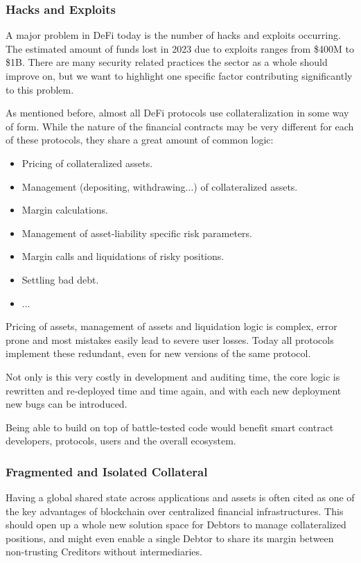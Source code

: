 \documentclass[sigconf,nonacm]{acmart}
\begin{document}
\subsubsection{Hacks and Exploits}
\label{subsubsec:hacks-and-exploits}

A major problem in DeFi today is the number of hacks and exploits occurring.
The estimated amount of funds lost in 2023 due to exploits ranges from \$400M to \$1B.
There are many security related practices the sector as a whole should improve on,
but we want to highlight one specific factor contributing significantly to this problem.

As mentioned before, almost all DeFi protocols use collateralization in some way of form.
While the nature of the financial contracts may be very different for each of these protocols, they share a great amount of common logic:
\begin{itemize}
    \item Pricing of collateralized assets.
    \item Management (depositing, withdrawing...) of collateralized assets.
    \item Margin calculations.
    \item Management of asset-liability specific risk parameters.
    \item Margin calls and liquidations of risky positions.
    \item Settling bad debt.
    \item ...
\end{itemize}

Pricing of assets, management of assets and liquidation logic is complex, error prone and most mistakes easily lead to severe user losses.
Today all protocols implement these redundant, even for new versions of the same protocol.

Not only is this very costly in development and auditing time, the core logic is rewritten and re-deployed time and time again,
and with each new deployment new bugs can be introduced.

Being able to build on top of battle-tested code would benefit smart contract developers, protocols, users and the overall ecosystem.

\subsubsection{Fragmented and Isolated Collateral}
\label{subsubsec:fragmented-collateral}

Having a global shared state across applications and assets is often cited as one of the key advantages of blockchain over centralized financial infrastructures\cite{schar2021decentralized}.
This should open up a whole new solution space for Debtors to manage collateralized positions,
and might even enable a single Debtor to share its margin between non-trusting Creditors without intermediaries.
\end{document}
